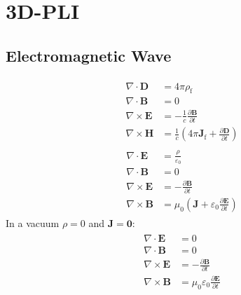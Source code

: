 \setcounter{chapter}{2}
\chapter{3D-PLI}
\label{sec:theory}
%
%
\section{Electromagnetic Wave}
% 
\begin{align} 
\begin{split} \label{eq::maxwell_macro}
    \nabla \cdot \mathbf{D} &= 4\pi\rho_\text{f}\\
    \nabla \cdot \mathbf{B} &= 0\\
    \nabla \times \mathbf{E} &= -\frac{1}{c} \frac{\partial \mathbf{B}} {\partial t}\\
    \nabla \times \mathbf{H} &= \frac{1}{c} \left(4\pi\mathbf{J}_\text{f} + \frac{\partial \mathbf{D}} {\partial t} \right)
\end{split}
\end{align}
% 
\begin{align} 
\begin{split} \label{eq::maxwell_general}
    \nabla \cdot \mathbf{E} &= \frac {\rho} {\varepsilon_0}\\
    \nabla \cdot \mathbf{B} &= 0\\
    \nabla \times \mathbf{E} &= -\frac{\partial \mathbf{B}} {\partial t}\\
    \nabla \times \mathbf{B} &= \mu_0\left(\mathbf{J} + \varepsilon_0 \frac{\partial \mathbf{E}} {\partial t} \right)
\end{split}
\end{align}
% 
In a vacuum $\rho = 0$ and $\mathbf{J} = \mathbf{0}$:
% 
\begin{align}
\begin{split} \label{eq::maxwell_vacuum}
  \nabla \cdot \mathbf{E} &= 0 \quad\\
  \nabla \cdot \mathbf{B} &= 0 \quad\\
  \nabla \times \mathbf{E} &= -\frac{\partial\mathbf B}{\partial t}\\
  \nabla \times \mathbf{B} &= \mu_0\varepsilon_0 \frac{\partial\mathbf E}{\partial t}
  \end{split}
\end{align}
